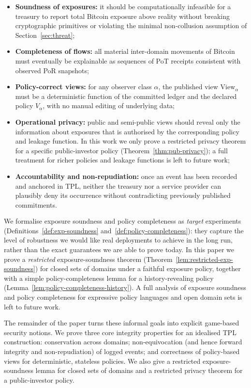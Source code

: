 \documentclass[11pt]{article}
\begin{document}
\begin{itemize}[noitemsep]
\item \textbf{Soundness of exposures:} it should be computationally infeasible for a treasury to report total Bitcoin exposure above reality without breaking cryptographic primitives or violating the minimal non-collusion assumption of Section~\ref{sec:threat};
\item \textbf{Completeness of flows:} all material inter-domain movements of Bitcoin must eventually be explainable as sequences of PoT receipts consistent with observed PoR snapshots;
\item \textbf{Policy-correct views:} for any observer class $\alpha$, the published view $\mathrm{View}_\alpha$ must be a deterministic function of the committed ledger and the declared policy $V_\alpha$, with no manual editing of underlying data;
\item \textbf{Operational privacy:} public and semi-public views should reveal only the information about exposures that is authorised by the corresponding policy and leakage function. In this work we only prove a restricted privacy theorem for a specific public-investor policy (Theorem~\ref{thm:pub-privacy}); a full treatment for richer policies and leakage functions is left to future work;
\item \textbf{Accountability and non-repudiation:} once an event has been recorded and anchored in TPL, neither the treasury nor a service provider can plausibly deny its occurrence without contradicting previously published commitments.
\end{itemize}

We formalise exposure soundness and policy completeness as \emph{target} experiments
(Definitions~\ref{def:exp-soundness} and~\ref{def:policy-completeness}): they capture the level of robustness
we would like real deployments to achieve in the long run, rather than the exact guarantees we are able to prove today.
In this paper we prove a \emph{restricted} exposure-soundness theorem (Theorem~\ref{lem:restricted-exp-soundness}) for
closed sets of domains under a faithful exposure policy, together with a simple policy-completeness lemma for a
history-revealing policy (Lemma~\ref{lem:policy-completeness-history}).
A full analysis of exposure soundness and policy completeness for expressive policy languages and open domain sets
is left to future work.

The remainder of the paper turns these informal goals into explicit game-based security notions.
We prove three core integrity properties for an idealised TPL construction: conservation across domains; non-equivocation (and hence forward integrity and non-repudiation) of logged events; and correctness of policy-based views for deterministic, stateless policies. We also give a restricted exposure-soundness lemma for closed sets of domains and a restricted privacy theorem for a public-investor policy.
\end{document}

